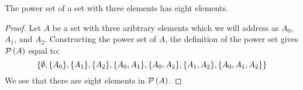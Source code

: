 \documentclass[main.tex]{subfiles}
\begin{document}
\subproblem{}\label{8c}

\begin{thm}[\(\card{A} = 3 \implies \card{\powerset{A}} = 8\)]
	The power set of a set with three elements has eight elements.
\end{thm}
\begin{proof}
	Let \(A\) be a set with three aribtrary elements which we will address
	as \(A_0\), \(A_1\), and \(A_2\). Constructing the power set of \(A\),
	the definition of the power set gives \(\mathcal{P}\left(A\right)\) equal to:
	\[\{\emptyset, \\
	\{A_0\}, \{A_1\}, \{A_2\}, \\
	\{A_0, A_1\}, \{A_0, A_2\}, \{A_1, A_2\},
	\{A_0, A_1, A_2\}\}\]
	We see that there are eight elements in \(\mathcal{P}\left(A\right)\).
\end{proof}
\end{document}
